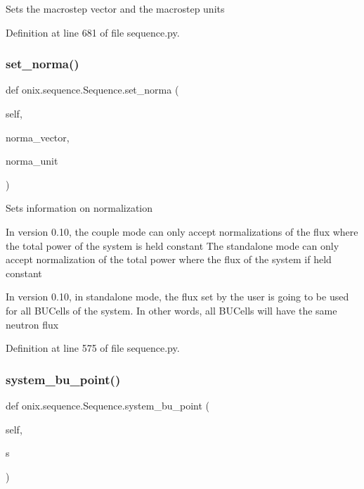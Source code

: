 \begin{DoxyVerb}Sets the macrostep vector and the macrostep units\end{DoxyVerb}
 

Definition at line 681 of file sequence.\+py.

\mbox{\label{classonix_1_1sequence_1_1Sequence_a305d34a407ea3e779db74ee59c648fc4}} 
\subsubsection{\texorpdfstring{set\+\_\+norma()}{set\_norma()}}
{\footnotesize\ttfamily def onix.\+sequence.\+Sequence.\+set\+\_\+norma (\begin{DoxyParamCaption}\item[{}]{self,  }\item[{}]{norma\+\_\+vector,  }\item[{}]{norma\+\_\+unit }\end{DoxyParamCaption})}

\begin{DoxyVerb}Sets information on normalization

In version 0.10, the couple mode can only accept normalizations of the flux
where the total power of the system is held constant
The standalone mode can only accept normalization of the total power
where the flux of the system if held constant

In version 0.10, in standalone mode, the flux set by the user is going to be
used for all BUCells of the system. In other words, all BUCells will have the
same neutron flux\end{DoxyVerb}
 

Definition at line 575 of file sequence.\+py.

\mbox{\label{classonix_1_1sequence_1_1Sequence_acdfb4ca5840aaee86adf897c81b8d494}} 
\subsubsection{\texorpdfstring{system\+\_\+bu\+\_\+point()}{system\_bu\_point()}}
{\footnotesize\ttfamily def onix.\+sequence.\+Sequence.\+system\+\_\+bu\+\_\+point (\begin{DoxyParamCaption}\item[{}]{self,  }\item[{}]{s }\end{DoxyParamCaption})}

